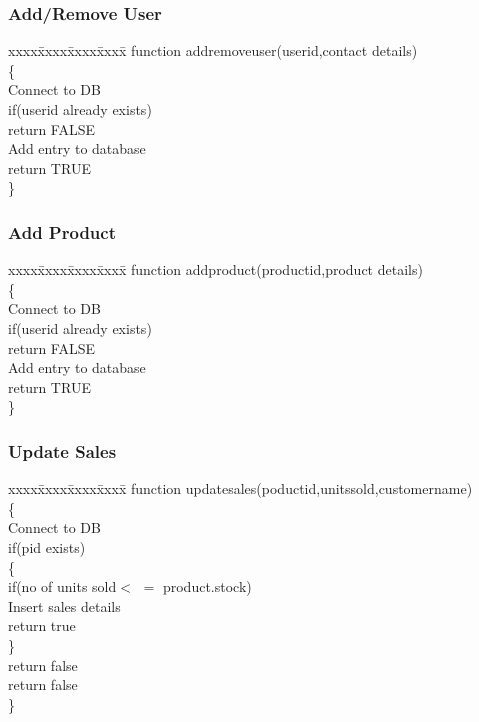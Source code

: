 \documentclass[twocolumn,10pt]{article}
\begin{document}
\subsubsection{Add/Remove User}
\begin{tabbing}
xxxx\=xxxx\=xxxx\=xxxx\= \kill
function addremoveuser(userid,contact details)\\
\{\>\\
\>Connect to DB\\
   \>if(userid already exists)\\
   \>\>return FALSE\\
   \>Add entry to database\\
   \>\>return TRUE\\
   \}\>
\end{tabbing}
\subsubsection{Add Product}
\begin{tabbing}
xxxx\=xxxx\=xxxx\=xxxx\= \kill
function addproduct(productid,product details)\\
\{\>\\
\>Connect to DB\\
\>if(userid already exists)\\
   \>\>return FALSE\\
   \>Add entry to database\\
   \>\>return TRUE\\
   \}\>
\end{tabbing}

\subsubsection{Update Sales}
\begin{tabbing}
xxxx\=xxxx\=xxxx\=xxxx\= \kill
function updatesales(poductid,unitssold,customername)\\
\{\>\\
\>Connect to DB\\
\>if(pid exists)\\
\>\>\{\>\\
\>\>if(no of units sold$<$ $=$ product.stock)\\
\>\>\>Insert sales details\\
\>\>\>return true\\
\>\>\}\>\\
\>\>return false\\
\>return false\\
\}\>\\
\end{tabbing}
\end{document}
